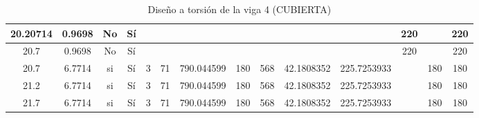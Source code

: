 \begin{table}[H]
{\begin{tabular}{|c|c|c|c|c|c|c|c|c|c|c|c|c|c|}
\hline
20.20714 & 0.9698 & No  & Sí  &     &     &     &     &     &     &     & 220 &     & 220 \bigstrut\\
\hline
20.7 & 0.9698 & No  & Sí  &     &     &     &     &     &     &     & 220 &     & 220 \bigstrut\\
\hline
20.7 & 6.7714 & si  & Sí  & 3   & 71  & 790.044599 & 180 & 568 & 42.1808352 & 225.7253933 &     & 180 & 180 \bigstrut\\
\hline
21.2 & 6.7714 & si  & Sí  & 3   & 71  & 790.044599 & 180 & 568 & 42.1808352 & 225.7253933 &     & 180 & 180 \bigstrut\\
\hline
21.7 & 6.7714 & si  & Sí  & 3   & 71  & 790.044599 & 180 & 568 & 42.1808352 & 225.7253933 &     & 180 & 180 \bigstrut\\
\hline
\end{tabular}%




  }
      \caption{Diseño a torsión de la viga 4 (CUBIERTA) }
  \label{tab:T VG4 CUB }%
\end{table}%